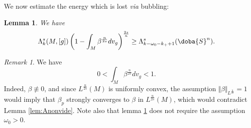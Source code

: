 \documentclass[10pt]{amsart}
\numberwithin{equation}{section}
\def\La{{\Lambda}}
\gdef\mS{\doba{S}}
\theoremstyle{plain}
\newtheorem{lemme}{Lemma}[section]%
\theoremstyle{remark}
\newtheorem{rem}{Remark}[section]
\begin{document}
We now estimate the energy which is lost \emph{via} bubbling: 
\begin{lemme}  \label{mu(S)}
We have 
 $$\La_k^s (M,[g]) \left(1- \int_M \beta^{\frac{n}{2s}} dv_g\right)^{\frac{2s}{n}}  \geq \Lambda_{k-\omega_0 -k_++1}^s(\mS^n).$$
\end{lemme}
\begin{rem} We have
\begin{equation} \label{intbeta}
0 < \int_M \beta^{\frac{n}{2s}} dv_g< 1.
\end{equation} Indeed, $\beta \not \equiv 0$, and since $L^{\frac{n}{2s}}(M)$ is uniformly convex, the assumption $\Vert \beta \Vert_{L^{\frac{n}{2s}}} = 1$ would imply that $\beta_p$ strongly converges to $\beta$ in $L^{\frac{n}{2s}}(M)$, which would contradict Lemma \ref{lem:Anonvide}. Note also that lemma \ref{mu(S)} does not require the assumption $\omega_0 >0$. 
\end{rem}
\end{document}
